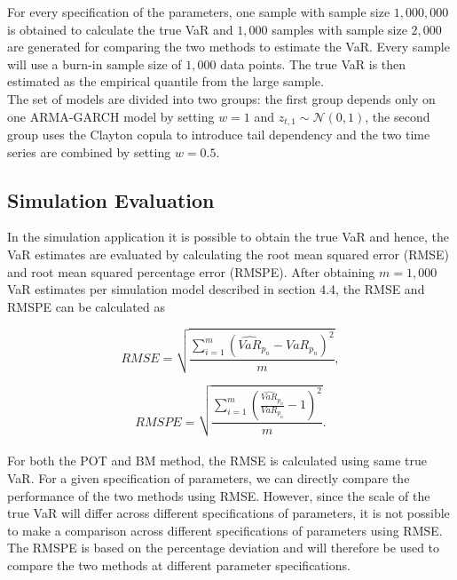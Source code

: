 \documentclass[a4paper,12pt]{article}
\theoremstyle{plain}
\begin{document}
For every specification of the parameters, one sample with sample size $1,000,000$ is obtained to calculate the true VaR and $1,000$ samples with sample size $2,000$ are generated for comparing the two methods to estimate the VaR. Every sample will use a burn-in sample size of $1,000$ data points. The true VaR is then estimated as the empirical quantile from the large sample.\\

The set of models are divided into two groups: the first group depends only on one ARMA-GARCH model by setting $w=1$ and $z_{t,1}\sim \mathcal{N}\left(0, 1\right)$, the second group uses the Clayton copula to introduce tail dependency and the two time series are combined by setting $w=0.5$.

\subsection{Simulation Evaluation}
In the simulation application it is possible to obtain the true VaR and hence, the VaR estimates are evaluated by calculating the root mean squared error (RMSE) and root mean squared percentage error (RMSPE). After obtaining $m=1,000$ VaR estimates per simulation model described in section 4.4, the RMSE and RMSPE can be calculated as

\begin{equation}
    RMSE = \sqrt{\frac{\sum^m_{i=1}\left(\widehat{VaR}_{p_n} - VaR_{p_n}\right)^2}{m}},
    \label{eq:rmse}
\end{equation}

\begin{equation}
    RMSPE = \sqrt{\frac{\sum^m_{i=1}\left(\frac{\widehat{VaR}_{p_n}}{VaR_{p_n}} - 1\right)^2}{m}}.
    \label{eq:mape}
\end{equation}
 \\
For both the POT and BM method, the RMSE is calculated using same true VaR. For a given specification of parameters, we can directly compare the performance of the two methods using RMSE. However, since the scale of the true VaR will differ across different specifications of parameters, it is not possible to make a comparison across different specifications of parameters using RMSE. The RMSPE is based on the percentage deviation and will therefore be used to compare the two methods at different parameter specifications. 
\end{document}
